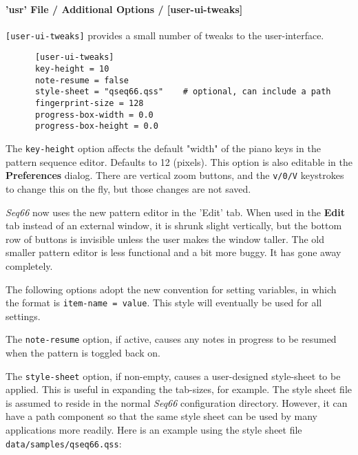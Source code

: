\paragraph{'usr' File / Additional Options / [user-ui-tweaks]}
\label{paragraph:user_file_added_options_tweaks}

   \texttt{[user-ui-tweaks]} provides a small number of tweaks to the
   user-interface.

   \begin{verbatim}
      [user-ui-tweaks]
      key-height = 10
      note-resume = false
      style-sheet = "qseq66.qss"    # optional, can include a path
      fingerprint-size = 128
      progress-box-width = 0.0
      progress-box-height = 0.0
   \end{verbatim}

   The \texttt{key-height} option
   affects the default "width" of the piano keys in the pattern
   sequence editor.  Defaults to 12 (pixels).
   This option is also editable in the \textbf{Preferences} dialog.
   There are vertical zoom buttons, and the \texttt{v/0/V} keystrokes to change
   this on the fly, but those changes are not saved.

   \textsl{Seq66} now uses the new pattern editor in the 'Edit' tab.
   When used in the \textbf{Edit} tab instead of an external window,
   it is shrunk slight vertically, but the bottom row of buttons is invisible
   unless the user makes the window taller.
   The old smaller pattern editor is less functional and a bit more buggy.
   It has gone away completely.

   The following options adopt the new convention for setting variables, in
   which the format is \texttt{item-name = value}.
   This style will eventually be used for all settings.

   The \texttt{note-resume} option, if active, causes any notes in progress
   to be resumed when the pattern is toggled back on.

   The \texttt{style-sheet} option, if non-empty, causes a user-designed
   style-sheet to be applied.  This is useful in expanding the tab-sizes, for
   example.
   The style sheet file is assumed to reside in the normal \textsl{Seq66}
   configuration directory.
   However, it can have a path component so that the same style sheet
   can be used by many applications more readily.
   Here is an example using the style sheet file
   \texttt{data/samples/qseq66.qss}:

